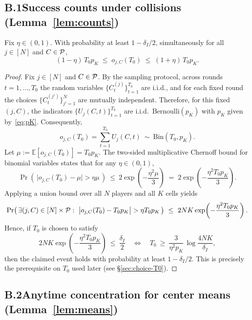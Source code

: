\subsection*{B.1\quad Success counts under collisions (Lemma~\ref{lem:counts})}

\begin{lemma}
Fix $\eta\in(0,1)$. With probability at least $1-\delta_{I}/2$, simultaneously for all $j\in[N]$ and $C\in \mathcal{P}$,
\[
(1-\eta)\,T_0 p_K \;\le\; o_{j,C}(T_0) \;\le\; (1+\eta)\,T_0 p_K.
\]
\end{lemma}

\begin{proof}
Fix $j\in[N]$ and $C\in\mathcal{P}$. By the sampling protocol, across rounds $t=1,\ldots,T_0$ the random variables $\{C_t^{(j)}\}_{t=1}^{T_0}$ are i.i.d., and for each fixed round the choices $\{C_t^{(j')}\}_{j'=1}^N$ are mutually independent. Therefore, for this fixed $(j,C)$, the indicators $\{U_j(C,t)\}_{t=1}^{T_0}$ are i.i.d.\ Bernoulli$(p_K)$ with $p_K$ given by~\eqref{eq:pK}. Consequently,
\[
o_{j,C}(T_0)=\sum_{t=1}^{T_0} U_j(C,t)\ \sim\ \mathrm{Bin}\!\left(T_0,p_K\right).
\]
Let $\mu:=\mathbb E[o_{j,C}(T_0)]=T_0 p_K$. The two-sided multiplicative Chernoff bound for binomial variables states that for any $\eta\in(0,1)$,
\[
\Pr\!\left(\,\big|o_{j,C}(T_0)-\mu\big|>\eta\mu\,\right)\ \le\ 2\exp\!\left(-\frac{\eta^2 \mu}{3}\right)
\;=\; 2\exp\!\left(-\frac{\eta^2 T_0 p_K}{3}\right).
\]
Applying a union bound over all $N$ players and all $K$ cells yields
\[
\Pr\!\left(\,\exists (j,C)\in [N]\times \Pcal:\ \big|o_{j,C}(T_0)-T_0 p_K\big|>\eta T_0 p_K \,\right)
\ \le\ 2 N K \exp\!\left(-\frac{\eta^2 T_0 p_K}{3}\right).
\]
Hence, if $T_0$ is chosen to satisfy
\begin{equation}
\label{eq:T0-prereq-counts}
2 N K \exp\!\left(-\frac{\eta^2 T_0 p_K}{3}\right)\ \le\ \frac{\delta_I}{2}
\quad\Longleftrightarrow\quad
T_0 \ \ge\ \frac{3}{\eta^2 p_K}\,\log\!\frac{4 N K}{\delta_I},
\end{equation}
then the claimed event holds with probability at least $1-\delta_I/2$. This is precisely the prerequisite on $T_0$ used later (see \S\ref{sec:choice-T0}).
\end{proof}


\subsection*{B.2\quad Anytime concentration for center means (Lemma~\ref{lem:means})}

